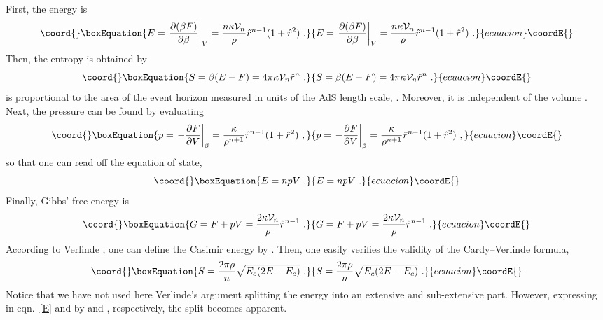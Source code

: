\documentclass[a4paper,12pt]{article}
\begin{document}
First, the energy is
\begin{equation}\coord{}\boxEquation{
\label{E}
  E =  \left.\frac{\partial (\beta F)}{\partial \beta}\right|_V =
  \frac{n \kappa \V_n}{\rho} \rh^{n-1} (1+\rh^2)~.
}{
E =  \left.\frac{\partial (\beta F)}{\partial \beta}\right|_V =
  \frac{n \kappa \V_n}{\rho} \rh^{n-1} (1+\rh^2)~.
}{ecuacion}\coordE{}\end{equation}
Then, the entropy is obtained by
\begin{equation}\coord{}\boxEquation{
\label{S}
  S = \beta(E - F) = 4\pi \kappa \V_n \rh^n~.
}{
S = \beta(E - F) = 4\pi \kappa \V_n \rh^n~.
}{ecuacion}\coordE{}\end{equation}
\coordHE{} is proportional to the area of the event horizon measured in units
of the AdS length scale, \coordHE{}. Moreover, it is independent of the
volume \coordHE{}. Next, the pressure can be found by evaluating
\begin{equation}\coord{}\boxEquation{
\label{p}
  p =  \left.-\frac{\partial F}{\partial V}\right|_\beta =
  \frac{\kappa}{\rho^{n+1}} \rh^{n-1} (1+\rh^2)~,
}{
p =  \left.-\frac{\partial F}{\partial V}\right|_\beta =
  \frac{\kappa}{\rho^{n+1}} \rh^{n-1} (1+\rh^2)~,
}{ecuacion}\coordE{}\end{equation}
so that one can read off the equation of state,
\begin{equation}\coord{}\boxEquation{
\label{eqofstate}
  E = npV~.
}{
E = npV~.
}{ecuacion}\coordE{}\end{equation}
Finally, Gibbs' free energy is
\begin{equation}\coord{}\boxEquation{
\label{G}
  G = F + pV = \frac{2 \kappa \V_n}\rho \rh^{n-1}~.
}{
G = F + pV = \frac{2 \kappa \V_n}\rho \rh^{n-1}~.
}{ecuacion}\coordE{}\end{equation}
According to Verlinde \cite{Verlinde00}, one can define the Casimir
energy by \coordHE{}. Then, one easily verifies the validity of the
Cardy--Verlinde formula,
\begin{equation}\coord{}\boxEquation{
\label{Cardy}
  S = \frac{2\pi\rho}n \sqrt{E_c(2E-E_c)}~.
}{
S = \frac{2\pi\rho}n \sqrt{E_c(2E-E_c)}~.
}{ecuacion}\coordE{}\end{equation}
Notice that we have not used here Verlinde's argument splitting the
energy into an extensive and sub-extensive part. However, expressing
in eqn.\ \eqref{E} \myHighlight{$\rho$}\coordHE{} and \myHighlight{$\rh$}\coordHE{} by \coordHE{} and \coordHE{}, respectively, the
split becomes apparent.
\end{document}

